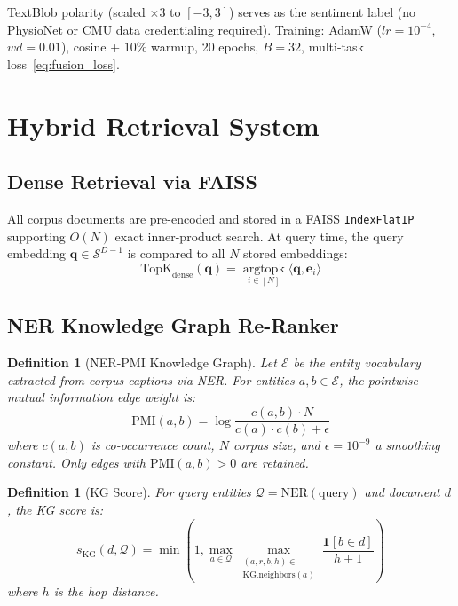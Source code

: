 \documentclass[10pt,conference]{IEEEtran}
\theoremstyle{ieeethm}
\theoremstyle{ieeedef}
\newtheorem{definition}[theorem]{Definition}
\theoremstyle{ieeeremark}
\begin{document}
TextBlob polarity (scaled $\times 3$ to $[-3,3]$) serves as the sentiment label (no PhysioNet or CMU data credentialing required). Training: AdamW ($lr{=}10^{-4}$, $wd{=}0.01$), cosine + $10\%$ warmup, 20 epochs, $B{=}32$, multi-task loss~\eqref{eq:fusion_loss}.

\section{Hybrid Retrieval System}
\label{sec:retrieval}

\subsection{Dense Retrieval via FAISS}

All corpus documents are pre-encoded and stored in a FAISS \texttt{IndexFlatIP} supporting $O(N)$ exact inner-product search. At query time, the query embedding $\mathbf{q} \in \mathcal{S}^{D-1}$ is compared to all $N$ stored embeddings:
\begin{equation}
\text{TopK}_{\text{dense}}(\mathbf{q}) = \operatorname*{argtopk}_{i \in [N]} \langle \mathbf{q}, \mathbf{e}_i \rangle
\label{eq:dense}
\end{equation}

\subsection{NER Knowledge Graph Re-Ranker}

\begin{definition}[NER-PMI Knowledge Graph]
\label{def:kg}
Let $\mathcal{E}$ be the entity vocabulary extracted from corpus captions via NER. For entities $a, b \in \mathcal{E}$, the pointwise mutual information edge weight is:
\begin{equation}
\text{PMI}(a,b) = \log\frac{c(a,b) \cdot N}{c(a) \cdot c(b) + \epsilon}
\label{eq:pmi}
\end{equation}
where $c(a,b)$ is co-occurrence count, $N$ corpus size, and $\epsilon{=}10^{-9}$ a smoothing constant. Only edges with $\text{PMI}(a,b) > 0$ are retained.
\end{definition}

\begin{definition}[KG Score]
\label{def:kg_score}
For query entities $\mathcal{Q} = \text{NER}(\text{query})$ and document $d$, the KG score is:
\begin{equation}
s_{\text{KG}}(d, \mathcal{Q}) = \min\!\left(1, \max_{a \in \mathcal{Q}} \max_{\substack{(a,r,b,h) \in \\ \text{KG.neighbors}(a)}} \frac{\mathbf{1}[b \in d]}{h+1}\right)
\label{eq:kg_score}
\end{equation}
where $h$ is the hop distance.
\end{definition}
\end{document}
